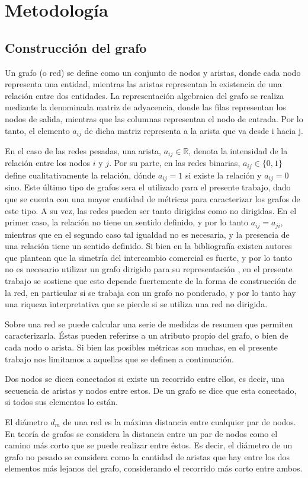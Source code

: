 \documentclass[class=article, crop=false]{standalone}
\begin{document}
\section{Metodología}\label{sec:c2metodologia}


\subsection{Construcción del grafo}

Un grafo (o red) se define como un conjunto de nodos y aristas, donde cada nodo representa una entidad, mientras las aristas representan la existencia de una relación entre dos entidades. La representación algebraica del grafo se realiza mediante la denominada matriz de adyacencia, donde las filas representan los nodos de salida, mientras que las columnas representan el nodo de entrada. Por lo tanto, el elemento $a_{ij}$ de dicha matriz representa a la arista que va desde i hacia j.

En el caso de las redes pesadas, una arista, $a_{ij} \in \mathbb{R}$, denota la intensidad de la relación entre los nodos $i$ y $j$. Por su parte, en las redes binarias, $a_{ij} \in \{0,1\}$ define cualitativamente la relación, dónde $a_{ij} = 1$ si existe la relación y $a_{ij} = 0$ sino. Este último tipo de grafos sera el utilizado para el presente trabajo, dado que se cuenta con una mayor cantidad de métricas para caracterizar los grafos de este tipo.      
A su vez, las redes pueden ser tanto dirigidas como no dirigidas. En el primer caso, la relación no tiene un sentido definido, y por lo tanto $a_{ij} = a_{ji}$, mientras que en el segundo caso tal igualdad no es necesaria, y la presencia de una relación tiene un sentido definido. Si bien en la bibliografía existen autores que plantean que la simetría del intercambio comercial es fuerte, y por lo tanto no es necesario utilizar un grafo dirigido para su representación \citep{Fagiolo2007}, en el presente trabajo se sostiene que esto depende fuertemente de la forma de construcción de la red, en particular si se trabaja con un grafo no ponderado, y por lo tanto hay una riqueza interpretativa que se pierde si se utiliza una red no dirigida.       


Sobre una red se puede calcular una serie de medidas de resumen que permiten caracterizarla. Éstas pueden referirse a un atributo propio del grafo, o bien de cada nodo o arista. Si bien las posibles métricas son muchas, en el presente trabajo nos limitamos a aquellas que se definen a continuación. \par    
Dos nodos se dicen conectados si existe un recorrido entre ellos, es decir, una secuencia de aristas y nodos entre estos. De un grafo se dice que esta conectado, si todos sus elementos lo están. \par
El diámetro $d_m$ de una red es la máxima distancia entre cualquier par de nodos. En teoría de grafos se considera la distancia entre un par de nodos como el camino más corto que se puede realizar entre éstos. Es decir, el diámetro de un grafo no pesado se considera como la cantidad de aristas que hay entre los dos elementos más lejanos del grafo, considerando el recorrido más corto entre ambos. 
\end{document}

